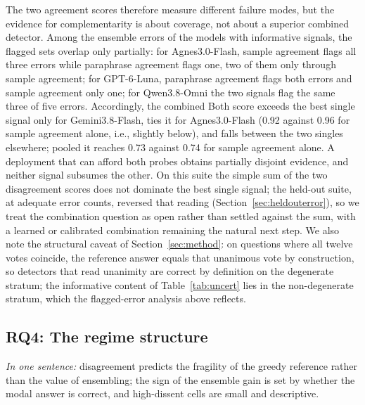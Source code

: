 The two agreement scores therefore measure different failure modes, but the evidence for complementarity is about coverage, not about a superior combined detector. Among the ensemble errors of the models with informative signals, the flagged sets overlap only partially: for Agnes3.0-Flash, sample agreement flags all three errors while paraphrase agreement flags one, two of them only through sample agreement; for GPT-6-Luna, paraphrase agreement flags both errors and sample agreement only one; for Qwen3.8-Omni the two signals flag the same three of five errors. Accordingly, the combined Both score exceeds the best single signal only for Gemini3.8-Flash, ties it for Agnes3.0-Flash (0.92 against 0.96 for sample agreement alone, i.e., slightly below), and falls between the two singles elsewhere; pooled it reaches 0.73 against 0.74 for sample agreement alone. A deployment that can afford both probes obtains partially disjoint evidence, and neither signal subsumes the other. On this suite the simple sum of the two disagreement scores does not dominate the best single signal; the held-out suite, at adequate error counts, reversed that reading (Section~\ref{sec:heldouterror}), so we treat the combination question as open rather than settled against the sum, with a learned or calibrated combination remaining the natural next step. We also note the structural caveat of Section~\ref{sec:method}: on questions where all twelve votes coincide, the reference answer equals that unanimous vote by construction, so detectors that read unanimity are correct by definition on the degenerate stratum; the informative content of Table~\ref{tab:uncert} lies in the non-degenerate stratum, which the flagged-error analysis above reflects.

\subsection{RQ4: The regime structure}
\label{app:rq4}
\label{sec:rq4}

\emph{In one sentence:} disagreement predicts the fragility of the greedy reference rather than the value of ensembling; the sign of the ensemble gain is set by whether the modal answer is correct, and high-dissent cells are small and descriptive.

